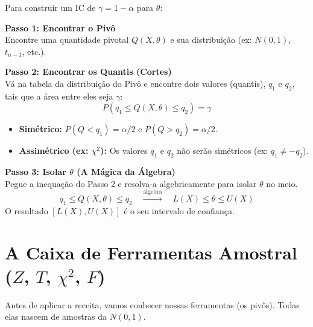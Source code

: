 \documentclass[12pt, a4paper]{article}
\theoremstyle{definition} %
\theoremstyle{remark} %
\begin{document}
\begin{mdframed}[frametitle={Receita de 3 Passos: Construindo um IC com um Pivô}, style=caixa_receita]
    Para construir um IC de $\gamma = 1-\alpha$ para $\theta$:

    \textbf{Passo 1: Encontrar o Pivô} \\
    Encontre uma quantidade pivotal $Q(X, \theta)$ e sua distribuição (ex: $N(0,1)$, $t_{n-1}$, etc.).

    \textbf{Passo 2: Encontrar os Quantis (Cortes)} \\
    Vá na tabela da distribuição do Pivô e encontre dois valores (quantis), $q_1$ e $q_2$, tais que a área entre eles seja $\gamma$:
    $$ P(q_1 \le Q(X, \theta) \le q_2) = \gamma $$
    \begin{itemize}
        \item \textbf{Simétrico:} $P(Q < q_1) = \alpha/2$ e $P(Q > q_2) = \alpha/2$.
        \item \textbf{Assimétrico (ex: $\chi^2$):} Os valores $q_1$ e $q_2$ não serão simétricos (ex: $q_1 \neq -q_2$).
    \end{itemize}
    
    \textbf{Passo 3: Isolar $\theta$ (A Mágica da Álgebra)} \\
    Pegue a inequação do Passo 2 e resolva-a algebricamente para isolar $\theta$ no meio.
    $$ q_1 \le Q(X, \theta) \le q_2 \quad \xrightarrow{\text{álgebra}} \quad L(X) \le \theta \le U(X) $$
    O resultado $[L(X), U(X)]$ é o seu intervalo de confiança.
\end{mdframed}

\section{A Caixa de Ferramentas Amostral (\texorpdfstring{$Z$, $T$, $\chi^2$, $F$}{Z, T, chi^2, F})}
Antes de aplicar a receita, vamos conhecer nossas ferramentas (os pivôs). Todas elas nascem de amostras da $N(0,1)$.
\end{document}
